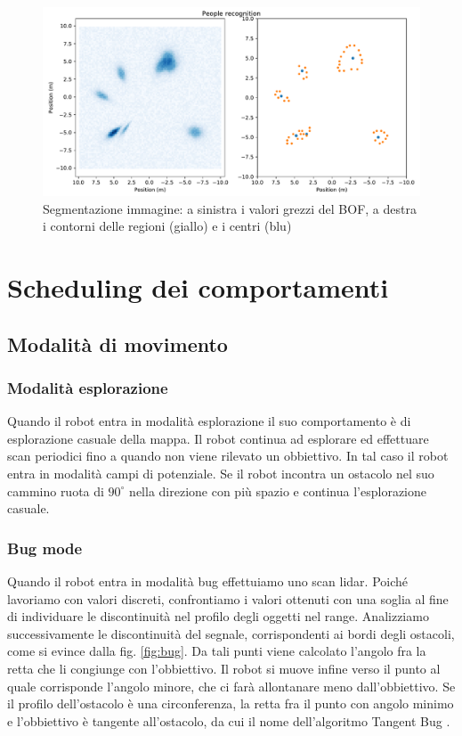 \documentclass[a4paper]{article}
\begin{document}
	\begin{figure}[H]
		\centering
		\includegraphics[width=1\textwidth]{./img/image_segmentation.pdf}
		\caption{Segmentazione immagine: a sinistra i valori grezzi del BOF, a destra i contorni delle regioni (giallo) e i centri (blu) }
		\label{fig:image_segmentation}
	\end{figure}

	\section{Scheduling dei comportamenti}\label{sec:Scheduling-dei-comportamenti}
	
	\subsection{Modalità di movimento}\label{subsec:Modalità-di-movimento}
	
	\subsubsection{Modalità esplorazione}\label{subsec:Modalita-esplorazione}
	Quando il robot entra in modalità esplorazione il suo comportamento è di
	esplorazione casuale della mappa. Il robot continua ad esplorare ed
	effettuare scan periodici fino a quando non viene rilevato un obbiettivo.
	In tal caso il robot entra in modalità campi di potenziale. Se il robot
	incontra un ostacolo nel suo cammino ruota di $90^{\circ}$ nella direzione
	con più spazio e continua l'esplorazione casuale.
	
	\subsubsection{Bug mode}\label{subsec:Bug-mode}
	Quando il robot entra in modalità bug effettuiamo uno scan lidar. Poiché
	lavoriamo con valori discreti, confrontiamo i valori ottenuti con una
	soglia al fine di individuare le discontinuità nel profilo degli oggetti
	nel range. Analizziamo successivamente le discontinuità del segnale,
	corrispondenti ai bordi degli ostacoli, come si evince dalla fig.
	\ref{fig:bug}. Da tali punti viene calcolato l'angolo fra la retta che li
	congiunge con l'obbiettivo. Il robot si muove infine verso il punto al
	quale corrisponde l'angolo minore, che ci farà allontanare meno
	dall'obbiettivo. Se il profilo dell'ostacolo è una circonferenza, la retta
	fra il punto con angolo minimo e l'obbiettivo è tangente all'ostacolo, da
	cui il nome dell'algoritmo Tangent Bug \cite{503814}.
	
\end{document}
